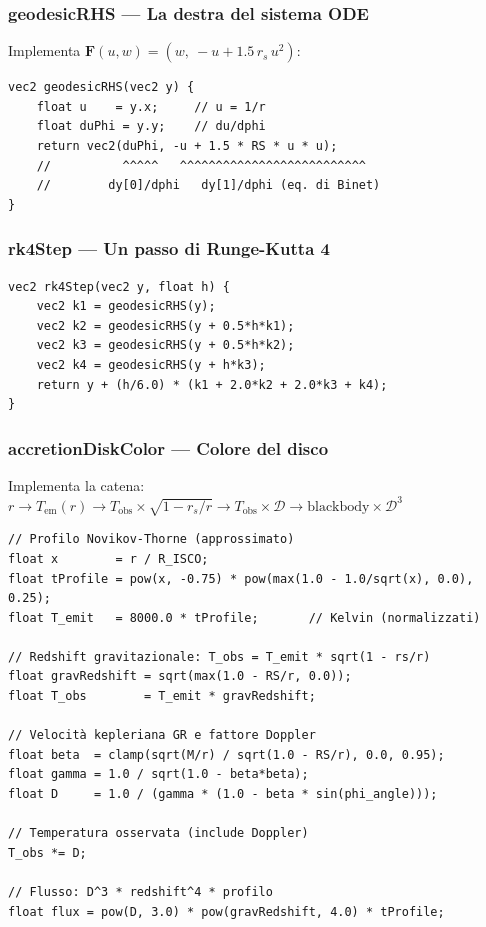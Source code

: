 \documentclass[12pt, a4paper, twoside]{article}
\theoremstyle{definition}
\newcommand{\RS}{r_{\!s}}          %
\begin{document}
\subsubsection{geodesicRHS — La destra del sistema ODE}

Implementa $\mathbf{F}(u,w) = (w,\ -u + 1.5\,\RS\,u^2)$:

\begin{tcolorbox}[codebox, title={geodesicRHS.glsl}]
\begin{verbatim}
vec2 geodesicRHS(vec2 y) {
    float u    = y.x;     // u = 1/r
    float duPhi = y.y;    // du/dphi
    return vec2(duPhi, -u + 1.5 * RS * u * u);
    //          ^^^^^   ^^^^^^^^^^^^^^^^^^^^^^^^^^
    //        dy[0]/dphi   dy[1]/dphi (eq. di Binet)
}
\end{verbatim}
\end{tcolorbox}

\subsubsection{rk4Step — Un passo di Runge-Kutta 4}

\begin{tcolorbox}[codebox, title={rk4Step.glsl}]
\begin{verbatim}
vec2 rk4Step(vec2 y, float h) {
    vec2 k1 = geodesicRHS(y);
    vec2 k2 = geodesicRHS(y + 0.5*h*k1);
    vec2 k3 = geodesicRHS(y + 0.5*h*k2);
    vec2 k4 = geodesicRHS(y + h*k3);
    return y + (h/6.0) * (k1 + 2.0*k2 + 2.0*k3 + k4);
}
\end{verbatim}
\end{tcolorbox}

\subsubsection{accretionDiskColor — Colore del disco}

Implementa la catena:
$r \to T_{\text{em}}(r) \to T_{\text{obs}} \times \sqrt{1-\RS/r} \to
T_{\text{obs}} \times \mathcal{D} \to \text{blackbody} \times \mathcal{D}^3$

\begin{tcolorbox}[codebox, title={accretionDiskColor.glsl}]
\begin{verbatim}
// Profilo Novikov-Thorne (approssimato)
float x        = r / R_ISCO;
float tProfile = pow(x, -0.75) * pow(max(1.0 - 1.0/sqrt(x), 0.0), 0.25);
float T_emit   = 8000.0 * tProfile;       // Kelvin (normalizzati)

// Redshift gravitazionale: T_obs = T_emit * sqrt(1 - rs/r)
float gravRedshift = sqrt(max(1.0 - RS/r, 0.0));
float T_obs        = T_emit * gravRedshift;

// Velocità kepleriana GR e fattore Doppler
float beta  = clamp(sqrt(M/r) / sqrt(1.0 - RS/r), 0.0, 0.95);
float gamma = 1.0 / sqrt(1.0 - beta*beta);
float D     = 1.0 / (gamma * (1.0 - beta * sin(phi_angle)));

// Temperatura osservata (include Doppler)
T_obs *= D;

// Flusso: D^3 * redshift^4 * profilo
float flux = pow(D, 3.0) * pow(gravRedshift, 4.0) * tProfile;
\end{verbatim}
\end{tcolorbox}
\end{document}
